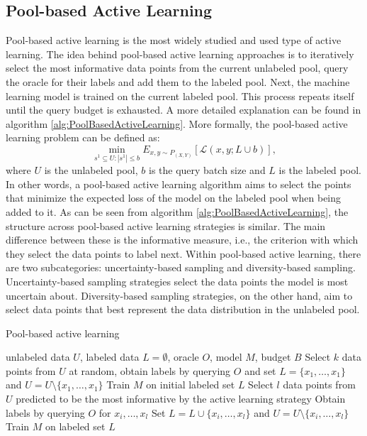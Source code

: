 \subsection{Pool-based Active Learning}
\label{sec:PoolBasedActiveLearning}
Pool-based active learning is the most widely studied and used type of active learning. The idea behind pool-based active learning approaches
is to iteratively select the most informative data points from the current unlabeled pool, query the oracle for their labels and add them to the
labeled pool. Next, the machine learning model is trained on the current labeled pool. This process repeats itself until the query budget is exhausted.
A more detailed explanation can be found in algorithm \ref{alg:PoolBasedActiveLearning}. More formally, the pool-based active learning problem
can be defined as:
\begin{equation}
    \min_{s^1 \subseteq U: |s^1| \leq b} E_{x,y \sim P_{(X,Y)}}[\mathcal{L}(x,y;L \cup b)],
\end{equation}
where $U$ is the unlabeled pool, $b$ is the query batch size and $L$ is the labeled pool.
In other words, a pool-based active learning algorithm aims to select the points that minimize the expected loss of the model on the labeled pool when
being added to it. As can be seen from algorithm \ref{alg:PoolBasedActiveLearning}, the structure across pool-based active learning strategies is similar.
The main difference between these is the informative measure, i.e., the criterion with which they select the data points to label next. Within 
pool-based active learning, there are two subcategories: uncertainty-based sampling and diversity-based sampling. 
Uncertainty-based sampling strategies select the data points the model is most uncertain about. Diversity-based sampling strategies, on the other
hand, aim to select data points that best represent the data distribution in the unlabeled pool.

\begin{algorithm}
    \caption{Pool-based active learning} \label{alg:PoolBasedActiveLearning}
    \begin{algorithmic}[1]
        \Require unlabeled data $U$, labeled data $L = \emptyset$, oracle $O$, model $M$, budget $B$
        \State Select $k$ data points from $U$ at random, obtain labels by querying $O$ and set $L=\{x_1,\ldots,x_1\}$
        and $U = U \setminus \{x_1,\ldots,x_1\}$ 
        \State Train $M$ on initial labeled set $L$
            \State Select $l$ data points from $U$ predicted to be the most informative by the active learning strategy
            \State Obtain labels by querying $O$ for $x_i,\ldots,x_l$
            \State Set $L= L \cup \{x_i,\ldots,x_l\}$ and $U = U \setminus \{x_i,\ldots,x_l\}$
            \State Train $M$ on labeled set $L$
        \EndWhile
    \end{algorithmic}
\end{algorithm}

